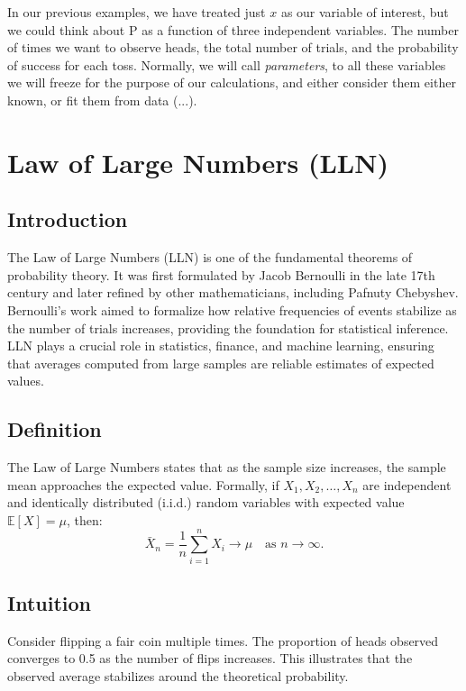 \documentclass{book}
\begin{document}
In our previous examples, we have treated just $x$ as our variable of interest, but we could think about P as a function of three independent variables. The number of times we want to observe heads, the total number of trials, and the probability of success for each toss. Normally, we will call \textit{parameters}, to all these variables we will freeze for the purpose of our calculations, and either consider them either known, or fit them from data (...).
 
 \newpage 
 
\section{Law of Large Numbers (LLN)}

\subsection*{Introduction}
The Law of Large Numbers (LLN) is one of the fundamental theorems of probability theory. It was first formulated by Jacob Bernoulli in the late 17th century and later refined by other mathematicians, including Pafnuty Chebyshev. Bernoulli's work aimed to formalize how relative frequencies of events stabilize as the number of trials increases, providing the foundation for statistical inference. LLN plays a crucial role in statistics, finance, and machine learning, ensuring that averages computed from large samples are reliable estimates of expected values.

\subsection{Definition}
The Law of Large Numbers states that as the sample size increases, the sample mean approaches the expected value. Formally, if $X_1, X_2, \dots, X_n$ are independent and identically distributed (i.i.d.) random variables with expected value $\mathbb{E}[X] = \mu$, then:
\begin{equation}
    \bar{X}_n = \frac{1}{n} \sum_{i=1}^{n} X_i \to \mu \quad \text{as } n \to \infty.
\end{equation}

\subsection{Intuition}
Consider flipping a fair coin multiple times. The proportion of heads observed converges to 0.5 as the number of flips increases. This illustrates that the observed average stabilizes around the theoretical probability.
\end{document}
